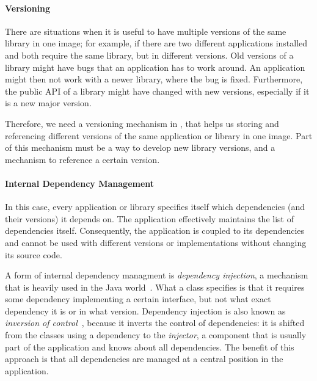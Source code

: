 \paragraph{Versioning}
There are situations when it is useful to have multiple versions of the same library in one image; for example, if there are two different applications installed and both require the same library, but in different versions. Old versions of a library might have bugs that an application has to work around. An application might then not work with a newer library, where the bug is fixed. Furthermore, the public API of a library might have changed with new versions, especially if it is a new major version.

Therefore, we need a versioning mechanism in \msname, that helps us storing and referencing different versions of the same application or library in one image. Part of this mechanism must be a way to develop new library versions, and a mechanism to reference a certain version.

\paragraph{Internal Dependency Management}
In this case, every application or library specifies itself which dependencies (and their versions) it depends on. The application effectively maintains the list of dependencies itself. Consequently, the application is coupled to its dependencies and cannot be used with different versions or implementations without changing its source code.

A form of internal dependency managment is \emph{dependency injection}, a mechanism that is heavily used in the Java world~\cite{Prasanna:2009:DI:1795686}. What a class specifies is that it requires some dependency implementing a certain interface, but not what exact dependency it is or in what version. Dependency injection is also known as \emph{inversion of control}~\cite{fowlerioc}, because it inverts the control of dependencies: it is shifted from the classes using a dependency to the \emph{injector}, a component that is usually part of the application and knows about all dependencies. The benefit of this approach is that all dependencies are managed at a central position in the application.

